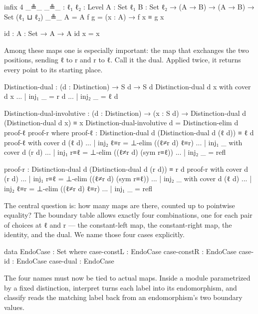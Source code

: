\documentclass[11pt,a4paper]{book}
\def\texttt#1{#1}%
\begin{document}
\begin{code}
infix 4 _≗_
_≗_ : {ℓ₁ ℓ₂ : Level} {A : Set ℓ₁} {B : Set ℓ₂} → (A → B) → (A → B) → Set (ℓ₁ ⊔ ℓ₂)
_≗_ {A = A} f g = (x : A) → f x ≡ g x

id : {A : Set} → A → A
id x = x
\end{code}

Among these maps one is especially important: the map that exchanges the
two positions, sending \texttt{ℓ} to \texttt{r} and \texttt{r} to
\texttt{ℓ}. Call it the dual. Applied twice, it returns every point to its
starting place.

\begin{code}
Distinction-dual : (d : Distinction) → S d → S d
Distinction-dual d x with cover d x
... | inj₁ _ = r d
... | inj₂ _ = ℓ d

Distinction-dual-involutive :
  (d : Distinction) →
  (x : S d) →
  Distinction-dual d (Distinction-dual d x) ≡ x
Distinction-dual-involutive d =
  Distinction-elim d proof-ℓ proof-r
  where
    proof-ℓ : Distinction-dual d (Distinction-dual d (ℓ d)) ≡ ℓ d
    proof-ℓ with cover d (ℓ d)
    ... | inj₂ ℓ≡r = ⊥-elim ((ℓ≠r d) ℓ≡r)
    ... | inj₁ _ with cover d (r d)
    ... | inj₁ r≡ℓ = ⊥-elim ((ℓ≠r d) (sym r≡ℓ))
    ... | inj₂ _   = refl

    proof-r : Distinction-dual d (Distinction-dual d (r d)) ≡ r d
    proof-r with cover d (r d)
    ... | inj₁ r≡ℓ = ⊥-elim ((ℓ≠r d) (sym r≡ℓ))
    ... | inj₂ _ with cover d (ℓ d)
    ... | inj₂ ℓ≡r = ⊥-elim ((ℓ≠r d) ℓ≡r)
    ... | inj₁ _   = refl
\end{code}

The central question is: how many maps are there, counted up to pointwise
equality? The boundary table allows exactly four combinations, one for each
pair of choices at \texttt{ℓ} and \texttt{r} --- the constant-left map,
the constant-right map, the identity, and the dual. We name those four
cases explicitly.

\begin{code}
data EndoCase : Set where
  case-constL : EndoCase
  case-constR : EndoCase
  case-id     : EndoCase
  case-dual   : EndoCase
\end{code}

The four names must now be tied to actual maps. Inside a module
parametrized by a fixed distinction, \texttt{interpret} turns each label
into its endomorphism, and \texttt{classify} reads the matching label back
from an endomorphism's two boundary values.
\end{document}
